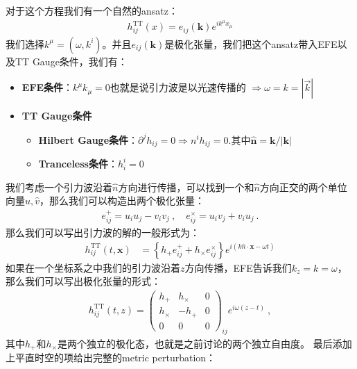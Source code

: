 对于这个方程我们有一个自然的ansatz：
\begin{align}
  h_{ij}^{\mathrm{TT}}(x)=e_{ij}(\mathbf{k})e^{ik^\mu x_\mu}
\end{align}
我们选择$ k^\mu = (\omega, k^i) $。并且$ e_{ij}(\mathbf{k})
$是极化张量，我们把这个ansatz带入EFE以及TT Gauge条件，我们有：
\begin{itemize}
  \item \textbf{EFE条件}：$ k^\mu k_\mu = 0 $也就是说引力波是以光速传播的 $
    \Rightarrow \omega = k = |\vec{k}| $
  \item \textbf{TT Gauge条件}
    \begin{itemize}
      \item \textbf{Hilbert Gauge条件}：$ \partial^jh_{ij}=0 \Rightarrow
        n^ih_{ij}=0. $其中$ \hat{\mathbf{n}}=\mathbf{k}/|\mathbf{k}| $
      \item \textbf{Tranceless条件}：$ h^i_i = 0 $
    \end{itemize}
\end{itemize}
我们考虑一个引力波沿着$ \hat{n} $方向进行传播，可以找到一个和$ \hat{n} $方向正交的两个单位向量$ \hat{u},
\hat{v} $，那么我们可以构造出两个极化张量：
\begin{align}
  e_{ij}^+ = u_iu_j - v_iv_j\mathrm{~,} \quad e_{ij}^\times =
  u_iv_j + v_iu_j\mathrm{~.}
\end{align}
那么我们可以写出引力波的解的一般形式为：
\begin{align}
  h_{ij}^{\mathrm{TT}}(t,\mathbf{x})&=\left\{h_+e_{ij}^+ + h_\times
  e_{ij}^\times\right\}e^{i(k \hat{n} \cdot \mathbf{x} - \omega t)}
\end{align}
如果在一个坐标系之中我们的引力波沿着$ z $方向传播，EFE告诉我们$ k_z = k = \omega $，那么我们可以写出极化张量的形式：
\begin{align}
  \left.h_{ij}^{\mathrm{TT}}(t,z)=\left(
    \begin{array}{ccc}h_+&h_\times&0\\h_\times&-h_+&0\\0&0&0
  \end{array}\right.\right)_{ij}e^{i\omega (z- t)}\mathrm{~,}
\end{align}
其中$ h_+ $和$ h_\times $是两个独立的极化态，也就是之前讨论的两个独立自由度。
最后添加上平直时空的项给出完整的metric perturbation：

